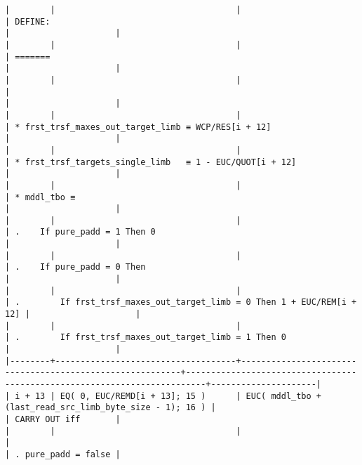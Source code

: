 \documentclass[varwidth=\maxdimen,margin=0.5cm,multi={verbatim}]{standalone}
\begin{document}
\begin{verbatim}
|        |                                    |                                                          | DEFINE:                                                                  |                     |
|        |                                    |                                                          | =======                                                                  |                     |
|        |                                    |                                                          |                                                                          |                     |
|        |                                    |                                                          | * frst_trsf_maxes_out_target_limb ≡ WCP/RES[i + 12]                      |                     |
|        |                                    |                                                          | * frst_trsf_targets_single_limb   ≡ 1 - EUC/QUOT[i + 12]                 |                     |
|        |                                    |                                                          | * mddl_tbo ≡                                                             |                     |
|        |                                    |                                                          | .    If pure_padd = 1 Then 0                                             |                     |
|        |                                    |                                                          | .    If pure_padd = 0 Then                                               |                     |
|        |                                    |                                                          | .        If frst_trsf_maxes_out_target_limb = 0 Then 1 + EUC/REM[i + 12] |                     |
|        |                                    |                                                          | .        If frst_trsf_maxes_out_target_limb = 1 Then 0                   |                     |
|--------+------------------------------------+----------------------------------------------------------+--------------------------------------------------------------------------+---------------------|
| i + 13 | EQ( 0, EUC/REMD[i + 13]; 15 )      | EUC( mddl_tbo + (last_read_src_limb_byte_size - 1); 16 ) |                                                                          | CARRY OUT iff       |
|        |                                    |                                                          |                                                                          | . pure_padd = false |

\end{verbatim}
\end{document}

